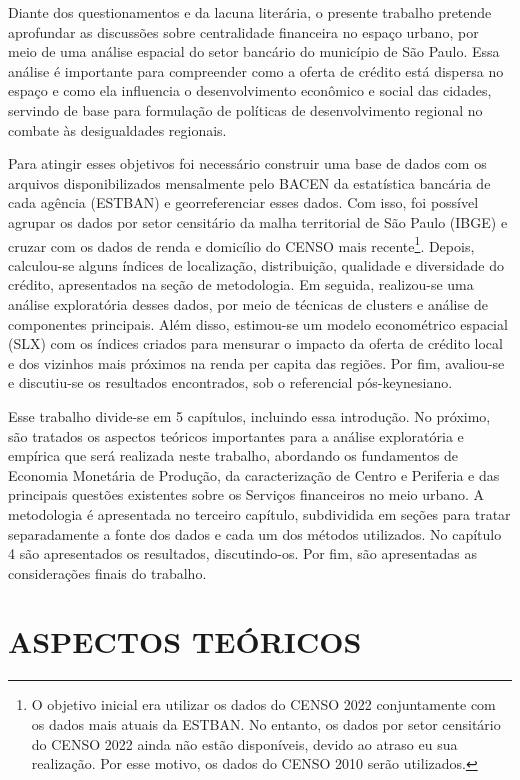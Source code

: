 \documentclass[a4paper,12pt]{article}
\begin{document}
Diante dos questionamentos e da lacuna literária, o presente trabalho
pretende aprofundar as discussões sobre centralidade financeira no
espaço urbano, por meio de uma análise espacial do setor bancário do
município de São Paulo. Essa análise é importante para compreender como
a oferta de crédito está dispersa no espaço e como ela influencia o
desenvolvimento econômico e social das cidades, servindo de base para
formulação de políticas de desenvolvimento regional no combate às
desigualdades regionais.

Para atingir esses objetivos foi necessário construir uma base de dados
com os arquivos disponibilizados mensalmente pelo BACEN da estatística
bancária de cada agência (ESTBAN) e georreferenciar esses dados. Com
isso, foi possível agrupar os dados por setor censitário da malha
territorial de São Paulo (IBGE) e cruzar com os dados de renda e
domicílio do CENSO mais recente\footnote{O objetivo inicial era utilizar
  os dados do CENSO 2022 conjuntamente com os dados mais atuais da
  ESTBAN. No entanto, os dados por setor censitário do CENSO 2022 ainda
  não estão disponíveis, devido ao atraso eu sua realização. Por esse
  motivo, os dados do CENSO 2010 serão utilizados.}. Depois, calculou-se
alguns índices de localização, distribuição, qualidade e diversidade do
crédito, apresentados na seção de metodologia. Em seguida, realizou-se
uma análise exploratória desses dados, por meio de técnicas de clusters
e análise de componentes principais. Além disso, estimou-se um modelo
econométrico espacial (SLX) com os índices criados para mensurar o
impacto da oferta de crédito local e dos vizinhos mais próximos na renda
per capita das regiões. Por fim, avaliou-se e discutiu-se os resultados
encontrados, sob o referencial pós-keynesiano.

Esse trabalho divide-se em 5 capítulos, incluindo essa introdução. No
próximo, são tratados os aspectos teóricos importantes para a análise
exploratória e empírica que será realizada neste trabalho, abordando os
fundamentos de Economia Monetária de Produção, da caracterização de
Centro e Periferia e das principais questões existentes sobre os
Serviços financeiros no meio urbano. A metodologia é apresentada no
terceiro capítulo, subdividida em seções para tratar separadamente a
fonte dos dados e cada um dos métodos utilizados. No capítulo 4 são
apresentados os resultados, discutindo-os. Por fim, são apresentadas as
considerações finais do trabalho.

\hypertarget{aspectos-teuxf3ricos}{%
\section{ASPECTOS TEÓRICOS}\label{aspectos-teuxf3ricos}}
\end{document}

